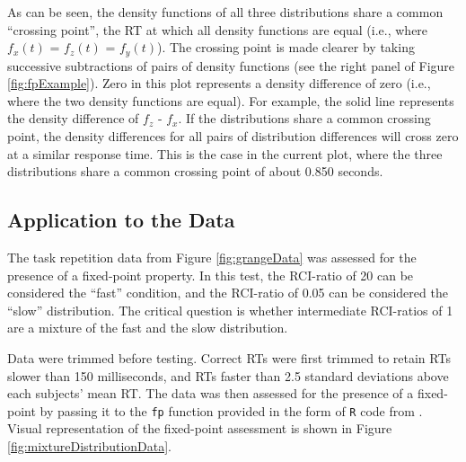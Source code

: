 \documentclass[a4paper, jou, natbib]{apa6}
\begin{document}
As can be seen, the density functions of all three distributions share a common ``crossing point'', the RT at which all density functions are equal (i.e., where $f_{x}(t)$ = $f_{z}(t)$ = $f_{y}(t)$). The crossing point is made clearer by taking successive subtractions of pairs of density functions (see the right panel of Figure \ref{fig:fpExample}). Zero in this plot represents a density difference of zero (i.e., where the two density functions are equal). For example, the solid line represents the density difference of $f_{z}$ - $f_{x}$. If the distributions share a common crossing point, the density differences for all pairs of distribution differences will cross zero at a similar response time. This is the case in the current plot, where the three distributions share a common crossing point of about 0.850 seconds.

\subsection{Application to the Data}
The task repetition data from Figure \ref{fig:grangeData} was assessed for the presence of a fixed-point property. In this test, the RCI-ratio of 20 can be considered the ``fast'' condition, and the RCI-ratio of 0.05 can be considered the ``slow'' distribution. The critical question is whether intermediate RCI-ratios of 1 are a mixture of the fast and the slow distribution. 

Data were trimmed before testing. Correct RTs were first trimmed to retain RTs slower than 150 milliseconds, and RTs faster than 2.5 standard deviations above each subjects' mean RT. The data was then assessed for the presence of a fixed-point by passing it to the \texttt{fp} function provided in the form of \texttt{R} code from \citet{VanMaanen2014}. Visual representation of the fixed-point assessment is shown in Figure \ref{fig:mixtureDistributionData}.
\end{document}
